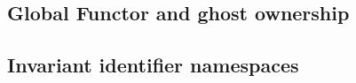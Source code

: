 
\subsection{Global Functor and ghost ownership}







\subsection{Invariant identifier namespaces}

